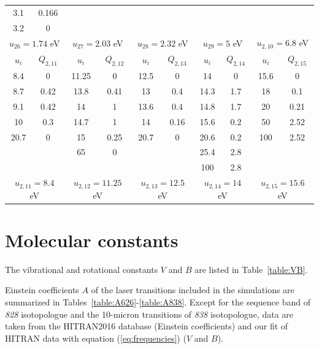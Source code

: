 \documentclass{report}
\begin{document}
\begin{appendices}
\begin{table}
\begin{tabular}{|c|c||c|c||c|c||c|c||c|c|}
3.1  & 0.166  &       &       &       &       &      &      &      &       \\
3.2  & 0      &       &       &       &       &      &      &      &       \\
\multicolumn{2}{|c||}{$u_{26}=1.74$ eV} &
\multicolumn{2}{c||}{$u_{27}=2.03$ eV} &
\multicolumn{2}{c||}{$u_{28}=2.32$ eV} &
\multicolumn{2}{c||}{$u_{29}=5$ eV} &
\multicolumn{2}{c|}{$u_{2,10}=6.8$ eV}\\
\hline
\hline 
$u_i$ & $Q_{2,11}$ & $u_i$ & $Q_{2,12}$ & $u_i$ & $Q_{2,13}$ & $u_i$ & $Q_{2,14}$ & $u_i$ & $Q_{2,15}$ \\                                                                             
\hline
8.4  & 0      & 11.25 & 0     & 12.5  & 0     & 14   & 0    & 15.6 & 0     \\
8.7  & 0.42   & 13.8  & 0.41  & 13    & 0.4   & 14.3 & 1.7  & 18   & 0.1   \\
9.1  & 0.42   & 14    & 1     & 13.6  & 0.4   & 14.8 & 1.7  & 20   & 0.21  \\
10   & 0.3    & 14.7  & 1     & 14    & 0.16  & 15.6 & 0.2  & 50   & 2.52  \\
20.7 & 0      & 15    & 0.25  & 20.7  & 0     & 20.6 & 0.2  & 100  & 2.52  \\
     &        & 65    & 0     &       &       & 25.4 & 2.8  &      &       \\
     &        &       &       &       &       & 100  & 2.8  &      &       \\
\multicolumn{2}{|c||}{$u_{2,11}=8.4$ eV} &
\multicolumn{2}{c||}{$u_{2,12}=11.25$ eV} &
\multicolumn{2}{c||}{$u_{2,13}=12.5$ eV} &
\multicolumn{2}{c||}{$u_{2,14}=14$ eV} &
\multicolumn{2}{c|}{$u_{2,15}=15.6$ eV}\\
\hline 
\end{tabular}
\end{table}


\chapter{Molecular constants}
\label{appendix:molecular_constants}

The vibrational and rotational constants $V$ and $B$ are listed in Table~\ref{table:VB}.

Einstein coefficients $A$ of the laser transitions included in the simulations are summarized in Tables~\ref{table:A626}-\ref{table:A838}. Except for the sequence band of \textit{828} isotopologue and the 10-micron transitions of \textit{838} isotopologue, data are taken from the HITRAN2016 database \cite{Gordon-2017} (Einstein coefficients) and our fit of HITRAN data with equation (\ref{eq:frequencies}) ($V$ and $B$).


\end{appendices}
\end{document}
